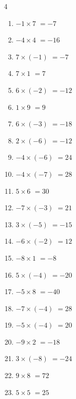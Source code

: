 \begin{multicols}{4}
\begin{enumerate}
  \item $-1\times 7$
        $=-7$

  \item $-4\times 4$
        $=-16$

  \item $7\times (-1)$
        $=-7$

  \item $7\times 1$
        $=7$

  \item $6\times (-2)$
        $=-12$

  \item $1\times 9$
        $=9$

  \item $6\times (-3)$
        $=-18$

  \item $2\times (-6)$
        $=-12$

  \item $-4\times (-6)$
        $=24$

  \item $-4\times (-7)$
        $=28$

  \item $5\times 6$
        $=30$

  \item $-7\times (-3)$
        $=21$

  \item $3\times (-5)$
        $=-15$

  \item $-6\times (-2)$
        $=12$

  \item $-8\times 1$
        $=-8$

  \item $5\times (-4)$
        $=-20$

  \item $-5\times 8$
        $=-40$

  \item $-7\times (-4)$
        $=28$

  \item $-5\times (-4)$
        $=20$

  \item $-9\times 2$
        $=-18$

  \item $3\times (-8)$
        $=-24$

  \item $9\times 8$
        $=72$

  \item $5\times 5$
        $=25$


\end{enumerate}
\end{multicols}
